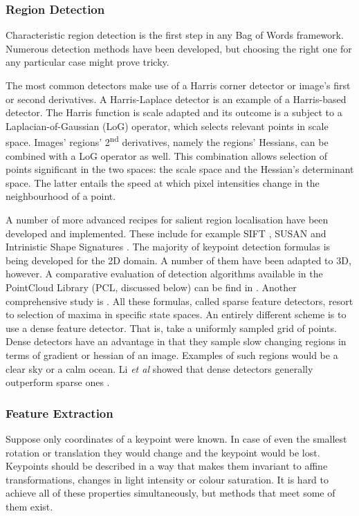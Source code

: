 		\subsubsection{Region Detection}
		Characteristic region detection is the first step in any Bag of Words framework. Numerous detection methods have been developed, but choosing the right one for any particular case might prove tricky. 
		
		The most common detectors make use of a Harris corner detector or image's first or second derivatives. A Harris-Laplace detector is an example of a Harris-based detector. The Harris function is scale adapted and its outcome is a subject to a Laplacian-of-Gaussian (LoG) operator, which selects relevant points in scale space. Images' regions' 2\textsuperscript{nd} derivatives, namely the regions' Hessians, can be combined with a LoG operator as well. This combination allows selection of points significant in the two spaces: the scale space and the Hessian's determinant space. The latter entails the speed at which pixel intensities change in the neighbourhood of a point.	
	
		A number of more advanced recipes for salient region localisation have been developed and implemented. These include for example SIFT \cite{sift_keypoint}, SUSAN \cite{susan_keypoint} and Intrinistic Shape Signatures \cite{iss_keypoint}. The majority of keypoint detection formulas is being developed for the 2D domain. A number of them have been adapted to 3D, however. A comparative evaluation of detection algorithms available in the PointCloud Library (PCL, discussed below) can be find in \cite{pcl_keypoint_comparision}. Another comprehensive study is \cite{3d_keypoint_eval}. All these formulas, called sparse feature detectors, resort to selection of maxima in specific state spaces. An entirely different scheme is to use a dense feature detector. That is, take a uniformly sampled grid of points. Dense detectors have an advantage in that they sample slow changing regions in terms of gradient or hessian of an image. Examples of such regions would be a clear sky or a calm ocean. Li \emph{et al} showed that dense detectors generally outperform sparse ones \cite{fei2005bayesian}.
		
		\subsubsection{Feature Extraction}
		Suppose only coordinates of a keypoint were known. In case of even the smallest rotation or translation they would change and the keypoint would be lost. Keypoints should be described in a way that makes them invariant to affine transformations, changes in light intensity or colour saturation. It is hard to achieve all of these properties simultaneously, but methods that meet some of them exist.
		
